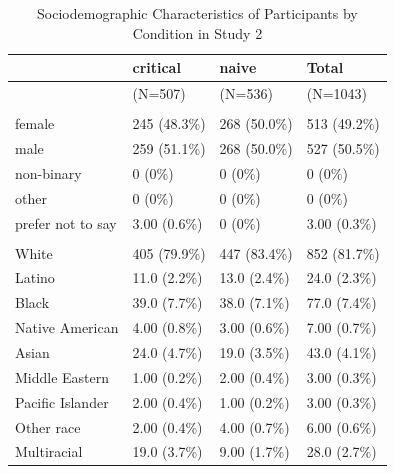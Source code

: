 \documentclass[
]{book}
\begin{document}
\begin{table}

\caption{\label{tab:demos-table-s2}Sociodemographic Characteristics of Participants by Condition in Study 2}
\centering
\begin{tabular}[t]{llll}
\toprule
  & critical & naive & Total\\
\midrule
 & (N=507) & (N=536) & (N=1043)\\
\addlinespace[0.3em]
\multicolumn{4}{l}{\textbf{Gender}}\\
\hspace{1em}female & 245 (48.3\%) & 268 (50.0\%) & 513 (49.2\%)\\
\hspace{1em}male & 259 (51.1\%) & 268 (50.0\%) & 527 (50.5\%)\\
\hspace{1em}non-binary & 0 (0\%) & 0 (0\%) & 0 (0\%)\\
\hspace{1em}other & 0 (0\%) & 0 (0\%) & 0 (0\%)\\
\hspace{1em}prefer not to say & 3.00 (0.6\%) & 0 (0\%) & 3.00 (0.3\%)\\
\addlinespace[0.3em]
\multicolumn{4}{l}{\textbf{Racial/ethnic Identity}}\\
\hspace{1em}White & 405 (79.9\%) & 447 (83.4\%) & 852 (81.7\%)\\
\hspace{1em}Latino & 11.0 (2.2\%) & 13.0 (2.4\%) & 24.0 (2.3\%)\\
\hspace{1em}Black & 39.0 (7.7\%) & 38.0 (7.1\%) & 77.0 (7.4\%)\\
\hspace{1em}Native American & 4.00 (0.8\%) & 3.00 (0.6\%) & 7.00 (0.7\%)\\
\hspace{1em}Asian & 24.0 (4.7\%) & 19.0 (3.5\%) & 43.0 (4.1\%)\\
\hspace{1em}Middle Eastern & 1.00 (0.2\%) & 2.00 (0.4\%) & 3.00 (0.3\%)\\
\hspace{1em}Pacific Islander & 2.00 (0.4\%) & 1.00 (0.2\%) & 3.00 (0.3\%)\\
\hspace{1em}Other race & 2.00 (0.4\%) & 4.00 (0.7\%) & 6.00 (0.6\%)\\
\hspace{1em}Multiracial & 19.0 (3.7\%) & 9.00 (1.7\%) & 28.0 (2.7\%)\\

\end{tabular}
\end{table}
\end{document}
